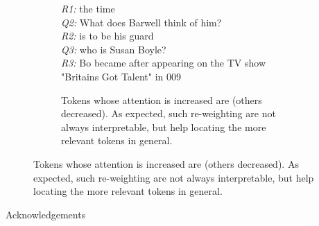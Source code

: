 \documentclass[final]{beamer}
\newlength{\rightcolwid}
\begin{document}
\begin{frame}[containsverbatim,t]
\begin{columns}[t]
\begin{column}{\rightcolwid}
\begin{block}{\color{mydarkgreen}{Experiment Results}}
\begin{figure}[htbp]
\begin{minipage}[b]{0.45\textwidth}
\begin{figure}[ht]
\begin{small}
\begin{framed}
\textit{R1:}  the time\\
\textit{Q2:} What does Barwell think of him?\\
\textit{R2:}  is  to be his guard\\
\textit{Q3:} who is Susan Boyle?\\
\textit{R3:}  Bo became  after appearing on the TV show "Britains Got Talent" in 009
  \end{framed}
  \end{small}
\caption{
Tokens whose attention is increased are  (others decreased).
As expected, such re-weighting are not always interpretable, but help locating the more relevant tokens in general.
}\label{fig:main:case}
\end{figure}
  \end{minipage}
\end{figure}


\end{block}







\begin{block}{Acknowledgements}

\small{} \\

\end{block}


\end{column}
\end{columns}
\end{frame}
\end{document}
